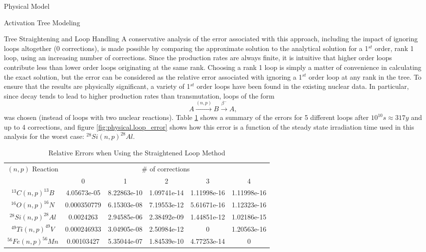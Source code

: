 \begin{chapter}{Physical Model\label{chap:physical}}
\begin{section}{Activation Tree Modeling\label{sec:physical.chains}}
\begin{subsection}{Tree Straightening and Loop Handling}
    A conservative analysis of the error associated with this
    approach\cite{UWFDM}, including the impact of ignoring loops
    altogether (0 corrections), is made possible by comparing the
    approximate solution to the analytical solution for a 1$^{st}$
    order, rank 1 loop, using an increasing number of corrections.
    Since the production rates are always finite, it is intuitive that
    higher order loops contribute less than lower order loops
    originating at the same rank.  Choosing a rank 1 loop is simply a
    matter of convenience in calculating the exact solution, but the
    error can be considered as the relative error associated with
    ignoring a 1$^{st}$ order loop at any rank in the tree.  To ensure
    that the results are physically significant, a variety of 1$^{st}$
    order loops have been found in the existing nuclear
    data\cite{Mann}.  In particular, since decay tends to lead to
    higher production rates than transmutation, loops of the form
    $$A \stackrel{(n,p)}{\longrightarrow} B
    \stackrel{\beta^-}{\longrightarrow} A,$$
    was chosen (instead of
    loops with two nuclear reactions).  Table
    \ref{tab:physical.loop_error} shows a summary of the errors for 5
    different loops after $10^{10} s \approx 317 y$ and up to 4
    corrections, and figure \ref{fig:physical.loop_error} shows how
    this error is a function of the steady state irradiation time used
    in this analysis for the worst case: $^{28}Si(n,p)^{28}Al$.
    
    \begin{table}
      \begin{center}
        \caption{Relative Errors when Using the Straightened Loop
          Method}\label{tab:physical.loop_error}
        \begin{tabular}{|c|c|c|c|c|c|} \hline
          $(n,p)$ Reaction & \multicolumn{5}{c|}{\# of
            corrections}\\\cline{2-6}
          & 0 & 1 & 2 & 3 & 4 \\\hline\hline
          $^{13}C(n,p)^{13}B$ & 4.05673e-05 & 8.22863e-10 & 1.09741e-14 &
          1.11998e-16 & 1.11998e-16\\\hline
          $^{16}O(n,p)^{16}N$ & 0.000350779 & 6.15303e-08 & 7.19553e-12 &
          5.61671e-16 & 1.12323e-16 \\\hline
          $^{28}Si(n,p)^{28}Al$ & 0.0024263 & 2.94585e-06 & 2.38492e-09 &
          1.44851e-12 & 1.02186e-15 \\\hline
          $^{49}Ti(n,p)^{49}V$ & 0.000246933 & 3.04905e-08 & 2.50984e-12 & 0 &
          1.20563e-16\\\hline
          $^{56}Fe(n,p)^{56}Mn$ & 0.00103427 & 5.35044e-07 & 1.84539e-10 &
          4.77253e-14 & 0\\\hline\hline
        \end{tabular}
      \end{center}
    \end{table}
    

\end{subsection}
\end{section}
\end{chapter}
